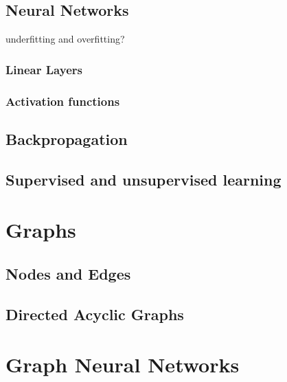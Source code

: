 \subsection{Neural Networks}
underfitting and overfitting?
\subsubsection{Linear Layers}
\subsubsection{Activation functions}
\subsection{Backpropagation}
\subsection{Supervised and unsupervised learning}














\section{Graphs}
\subsection{Nodes and Edges}
\subsection{Directed Acyclic Graphs}




\section{Graph Neural Networks}

